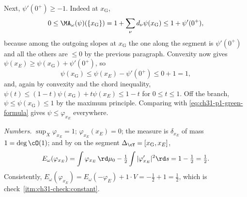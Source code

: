 \begin{example}
Next, \(\psi'(0^+)\geq-1\).  Indeed at \(x_{\mathrm G}\),
\[
 0\leq\MA_\omega(\psi)(\{x_{\mathrm G}\})
   =1+\sum_{\nu}d_\nu\psi(x_{\mathrm G})
   \leq1+\psi'(0^+),
\]
because among the outgoing slopes at \(x_{\mathrm G}\) the one along the
segment is \(\psi'(0^+)\) and all the others are \(\leq0\) by the previous
paragraph.  Convexity now gives
\(\psi(x_E)\geq\psi(x_{\mathrm G})+\psi'(0^+)\), so
\[
 \psi(x_{\mathrm G})\leq\psi(x_E)-\psi'(0^+)\leq0+1=1 ,
\]
and, again by convexity and the chord inequality,
\(\psi(t)\leq(1-t)\psi(x_{\mathrm G})+t\psi(x_E)\leq1-t\) for
\(0\leq t\leq1\).  Off the branch, \(\psi\leq\psi(x_{\mathrm G})\leq1\) by
the maximum principle.  Comparing with
\eqref{eq:ch31-p1-green-formula} gives \(\psi\leq\varphi_{x_E}\)
everywhere.

\emph{Numbers.}  \(\sup_X\varphi_{x_E}=1\); \(\varphi_{x_E}(x_E)=0\); the
measure is \(\delta_{x_E}\) of mass \(1=\deg\cO(1)\); and by
 on the segment
\(\Delta_{\cY}=[x_{\mathrm G},x_E]\),
\[
 E_\omega(\varphi_{x_E})
 =\int\varphi_{x_E}\,\rd\mu_0-\tfrac12\int|\varphi_{x_E}'|^2\rd s
 =1-\tfrac12=\tfrac12 .
\]
Consistently, \(E_\omega(\varphi_{x_E})=E_\omega(-\varphi_E)+1\cdot V
 =-\tfrac12+1=\tfrac12\), which is
check~\cref{itm:ch31-check:constant}.
\end{example}

